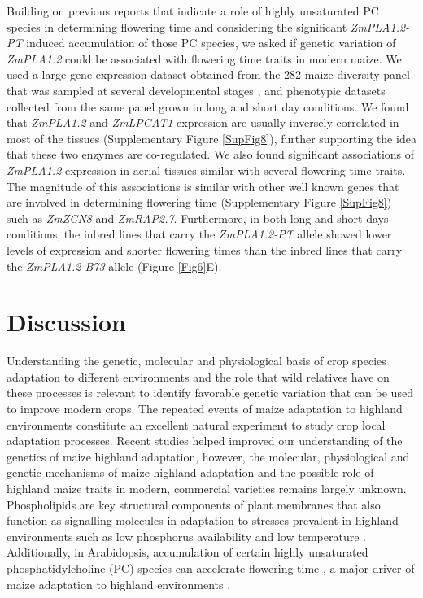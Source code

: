 \documentclass[9pt,twocolumn,twoside,lineno]{BioRxiv}
\begin{document}
Building on previous reports that indicate a role of highly unsaturated PC species in determining flowering time \cite{Nakamura2014-qf, Riedelsheimer2013-bd} and considering the significant \textit{ZmPLA1.2-PT} induced accumulation of those PC species, we asked if genetic variation of \textit{ZmPLA1.2} could be associated with flowering time traits in modern maize. 
We used a large gene expression dataset obtained from the 282 maize diversity panel that was sampled at several developmental stages \cite{Kremling2018-gn}, and phenotypic datasets collected from the same panel grown in long and short day conditions.
We found that \textit{ZmPLA1.2} and \textit{ZmLPCAT1} expression are usually inversely correlated in most of the tissues (Supplementary Figure \ref{SupFig8}), further supporting the idea that these two enzymes are co-regulated. 
We also found significant associations of \textit{ZmPLA1.2} expression in aerial tissues similar with several flowering time traits. 
The magnitude of this associations is similar with other well known genes that are involved in determining flowering time (Supplementary Figure \ref{SupFig8}) such as \textit{ZmZCN8}  and \textit{ZmRAP2.7}.  
Furthermore, in both long and short days conditions, the inbred lines that carry the \textit{ZmPLA1.2-PT} allele showed lower levels of expression and shorter flowering times than the inbred lines that carry the \textit{ZmPLA1.2-B73} allele  (Figure \ref{Fig6}E). 
 \section{Discussion}
\label{sec:discussion}
Understanding the genetic, molecular and  physiological basis of crop species adaptation to different environments and the role that wild relatives have on these processes is relevant to identify favorable genetic variation that can be used to improve modern crops.
The repeated events of maize adaptation to highland environments constitute an excellent natural experiment to study crop local adaptation processes. 
Recent studies \cite{Wang2020-mp, Takuno2015-uj, Crow2020-gene} helped improved our understanding of the genetics of maize highland adaptation, however, the molecular, physiological and genetic mechanisms of maize highland adaptation and the possible role of highland maize traits in modern, commercial varieties remains largely unknown.
Phospholipids are key structural components of plant membranes that also function as signalling molecules in adaptation to stresses prevalent in highland environments \cite{Ryu2004-iv, Nakamura2017-vb} such as low phosphorus availability \cite{Veneklaas2012-ls, Cruz-Ramirez2004-ib, Lambers2012-an} and low temperature \cite{Degenkolbe2012-wf, Welti2002-uk, Marla2017-ph}. 
Additionally, in Arabidopsis, accumulation of certain highly unsaturated phosphatidylcholine (PC) species can accelerate flowering time \cite{Nakamura2014-qf}, a major driver of maize adaptation to highland environments \cite{Romero_Navarro2017-cn, Gates2019-xu}.
 
\end{document}
